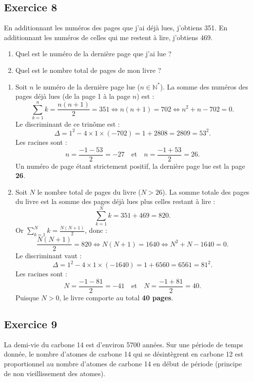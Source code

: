 \documentclass[11pt,a4paper]{article}
\newcommand{\N}{\mathbb{N}}
\begin{document}
\subsection*{Exercice 8}
En additionnant les numéros des pages que j'ai déjà lues, j'obtiens 351. En additionnant les numéros de celles qui me restent à lire, j'obtiens 469.
\begin{enumerate}
    \item Quel est le numéro de la dernière page que j'ai lue ?
    \item Quel est le nombre total de pages de mon livre ?
\end{enumerate}

\begin{correctionbox}
\begin{enumerate}
    \item Soit $n$ le numéro de la dernière page lue ($n \in \N^*$).
    La somme des numéros des pages déjà lues (de la page 1 à la page $n$) est :
    \[
    \sum_{k=1}^n k = \frac{n(n+1)}{2} = 351 \iff n(n+1) = 702 \iff n^2 + n - 702 = 0.
    \]
    Le discriminant de ce trinôme est :
    \[
    \Delta = 1^2 - 4 \times 1 \times (-702) = 1 + 2808 = 2809 = 53^2.
    \]
    Les racines sont :
    \[
    n = \frac{-1 - 53}{2} = -27 \quad \text{et} \quad n = \frac{-1 + 53}{2} = 26.
    \]
    Un numéro de page étant strictement positif, la dernière page lue est la page \textbf{26}.

    \item Soit $N$ le nombre total de pages du livre ($N > 26$).
    La somme totale des pages du livre est la somme des pages déjà lues plus celles restant à lire :
    \[
    \sum_{k=1}^N k = 351 + 469 = 820.
    \]
    Or $\sum_{k=1}^N k = \frac{N(N+1)}{2}$, donc :
    \[
    \frac{N(N+1)}{2} = 820 \iff N(N+1) = 1640 \iff N^2 + N - 1640 = 0.
    \]
    Le discriminant vaut :
    \[
    \Delta = 1^2 - 4 \times 1 \times (-1640) = 1 + 6560 = 6561 = 81^2.
    \]
    Les racines sont :
    \[
    N = \frac{-1 - 81}{2} = -41 \quad \text{et} \quad N = \frac{-1 + 81}{2} = 40.
    \]
    Puisque $N > 0$, le livre comporte au total \textbf{40 pages}.
\end{enumerate}
\end{correctionbox}

\subsection*{Exercice 9}
La demi-vie du carbone 14 est d'environ 5700 années. Sur une période de temps donnée, le nombre d'atomes de carbone 14 qui se désintègrent en carbone 12 est proportionnel au nombre d'atomes de carbone 14 en début de période (principe de non vieillissement des atomes).
\end{document}
